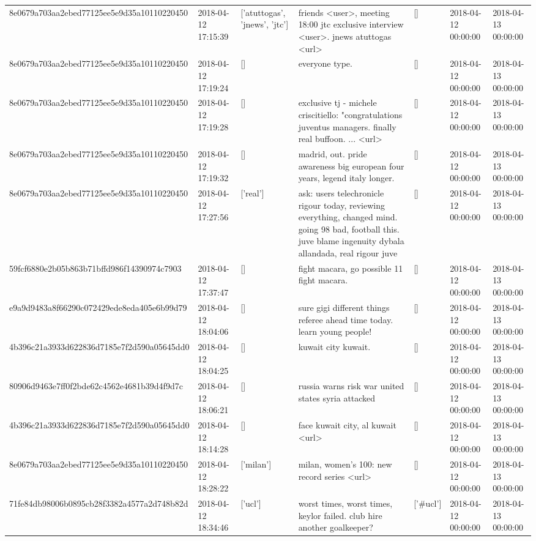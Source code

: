 \begin{tabular}{lllllll}
8e0679a703aa2ebed77125ee5e9d35a10110220450 & 2018-04-12 17:15:39 & ['atuttogas', 'jnews', 'jtc'] & friends <user>, meeting 18:00 jtc exclusive interview <user>. jnews atuttogas <url> & [] & 2018-04-12 00:00:00 & 2018-04-13 00:00:00 \\
8e0679a703aa2ebed77125ee5e9d35a10110220450 & 2018-04-12 17:19:24 & [] & everyone type. & [] & 2018-04-12 00:00:00 & 2018-04-13 00:00:00 \\
8e0679a703aa2ebed77125ee5e9d35a10110220450 & 2018-04-12 17:19:28 & [] & exclusive tj - michele criscitiello: "congratulations juventus managers. finally real buffoon. ... <url> & [] & 2018-04-12 00:00:00 & 2018-04-13 00:00:00 \\
8e0679a703aa2ebed77125ee5e9d35a10110220450 & 2018-04-12 17:19:32 & [] & madrid, out. pride awareness big european four years, legend italy longer. & [] & 2018-04-12 00:00:00 & 2018-04-13 00:00:00 \\
8e0679a703aa2ebed77125ee5e9d35a10110220450 & 2018-04-12 17:27:56 & ['real'] & ask: users telechronicle rigour today, reviewing everything, changed mind. going 98 bad, football this. juve blame ingenuity dybala allandada, real rigour juve & [] & 2018-04-12 00:00:00 & 2018-04-13 00:00:00 \\
59fcf6880e2b05b863b71bffd986f14390974c7903 & 2018-04-12 17:37:47 & [] & fight macara, go possible 11 fight macara. & [] & 2018-04-12 00:00:00 & 2018-04-13 00:00:00 \\
e9a9d9483a8f66290c072429ede8eda405e6b99d79 & 2018-04-12 18:04:06 & [] & sure gigi different things referee ahead time today. learn young people! & [] & 2018-04-12 00:00:00 & 2018-04-13 00:00:00 \\
4b396c21a3933d622836d7185e7f2d590a05645dd0 & 2018-04-12 18:04:25 & [] & kuwait city kuwait. & [] & 2018-04-12 00:00:00 & 2018-04-13 00:00:00 \\
80906d9463e7ff0f2bde62c4562e4681b39d4f9d7c & 2018-04-12 18:06:21 & [] & russia warns risk war united states syria attacked & [] & 2018-04-12 00:00:00 & 2018-04-13 00:00:00 \\
4b396c21a3933d622836d7185e7f2d590a05645dd0 & 2018-04-12 18:14:28 & [] & face kuwait city, al kuwait <url> & [] & 2018-04-12 00:00:00 & 2018-04-13 00:00:00 \\
8e0679a703aa2ebed77125ee5e9d35a10110220450 & 2018-04-12 18:28:22 & ['milan'] & milan, women's 100: new record series <url> & [] & 2018-04-12 00:00:00 & 2018-04-13 00:00:00 \\
71fe84db98006b0895cb28f3382a4577a2d748b82d & 2018-04-12 18:34:46 & ['ucl'] & worst times, worst times, keylor failed. club hire another goalkeeper? & ['#ucl'] & 2018-04-12 00:00:00 & 2018-04-13 00:00:00 \\

\end{tabular}
